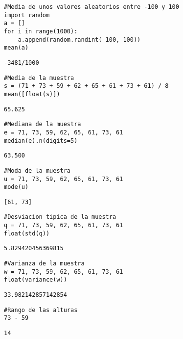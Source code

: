 \documentclass[
]{article}
\author{}
\date{}
\begin{document}
\begin{verbatim}
#Media de unos valores aleatorios entre -100 y 100
import random
a = []
for i in range(1000):
    a.append(random.randint(-100, 100))
mean(a)
\end{verbatim}

\begin{verbatim}
-3481/1000
\end{verbatim}

\begin{verbatim}
#Media de la muestra
s = (71 + 73 + 59 + 62 + 65 + 61 + 73 + 61) / 8
mean([float(s)])
\end{verbatim}

\begin{verbatim}
65.625
\end{verbatim}

\begin{verbatim}
#Mediana de la muestra
e = 71, 73, 59, 62, 65, 61, 73, 61
median(e).n(digits=5)
\end{verbatim}

\begin{verbatim}
63.500
\end{verbatim}

\begin{verbatim}
#Moda de la muestra
u = 71, 73, 59, 62, 65, 61, 73, 61
mode(u)
\end{verbatim}

\begin{verbatim}
[61, 73]
\end{verbatim}

\begin{verbatim}
#Desviacion tipica de la muestra
q = 71, 73, 59, 62, 65, 61, 73, 61
float(std(q))
\end{verbatim}

\begin{verbatim}
5.829420456369815
\end{verbatim}

\begin{verbatim}
#Varianza de la muestra
w = 71, 73, 59, 62, 65, 61, 73, 61
float(variance(w))
\end{verbatim}

\begin{verbatim}
33.982142857142854
\end{verbatim}

\begin{verbatim}
#Rango de las alturas
73 - 59
\end{verbatim}

\begin{verbatim}
14
\end{verbatim}
\end{document}
